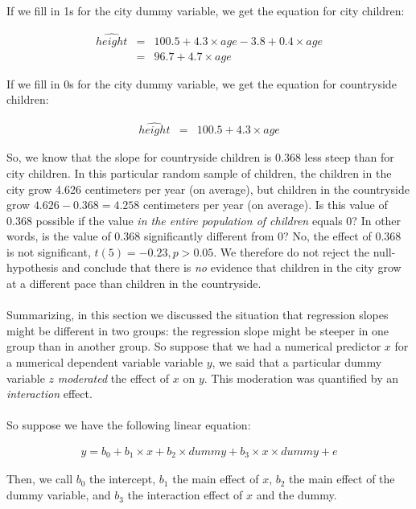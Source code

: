 \documentclass[]{book}\usepackage[]{graphicx}\usepackage[]{color}
\begin{document}
If we fill in 1s for the city dummy variable, we get the equation for city children:

\begin{eqnarray} 
\widehat{height} &=& 100.5 + 4.3  \times age  -3.8  + 0.4 \times age    \nonumber \\
   &=&      96.7 + 4.7 \times age
 \end{eqnarray}


If we fill in 0s for the city dummy variable, we get the equation for countryside children:

\begin{eqnarray} 
\widehat{height} &=& 100.5 + 4.3  \times age   \nonumber
 \end{eqnarray}

So, we know that the slope for countryside children is 0.368 less steep than for city children. In this particular random sample of children, the children in the city grow 4.626 centimeters per year (on average), but children in the countryside grow $4.626-0.368= 4.258$ centimeters per year (on average). Is this value of 0.368 possible if the value \textit{in the entire population of children} equals 0? In other words, is the value of 0.368 significantly different from 0? No, the effect of 0.368 is not significant, $t(5)=-0.23, p>0.05$. We therefore do not reject the null-hypothesis and conclude that there is \textit{no} evidence that children in the city grow at a different pace than children in the countryside.\\
\\
Summarizing, in this section we discussed the situation that regression slopes might be different in two groups: the regression slope might be steeper in one group than in another group. So suppose that we had a numerical predictor $x$ for a numerical dependent variable variable $y$, we said that a particular dummy variable $z$ \textit{moderated} the effect of $x$ on $y$. This moderation was quantified by an \textit{interaction} effect.
\\
\\
So suppose we have the following linear equation:


\begin{eqnarray} 
y =  b_0 + b_1  \times x + b_2  \times dummy +b_3 \times x \times dummy + e \nonumber
\end{eqnarray}

Then, we call $b_0$ the intercept, $b_1$ the main effect of $x$, $b_2$ the main effect of the dummy variable, and $b_3$ the interaction effect of $x$ and the dummy. 
\end{document}
